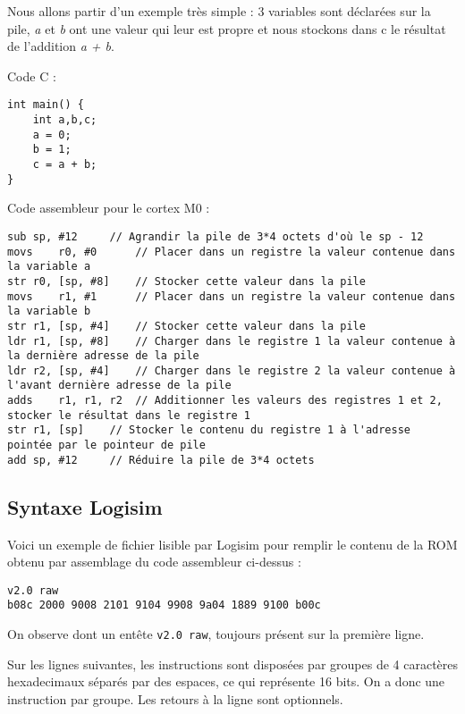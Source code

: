 Nous allons partir d'un exemple très simple : 3 variables sont déclarées sur la pile, \textit{a} et \textit{b} ont une valeur qui leur est propre et nous stockons dans c le résultat de l'addition \textit{a + b}.
\newline 
{}
\begin{minipage}{\linewidth}
Code C :
\begin{lstlisting}
int main() {
	int a,b,c;
	a = 0;
	b = 1;
	c = a + b;
}
\end{lstlisting}
\end{minipage}
\begin{center}
\begin{minipage}{\linewidth}
Code assembleur pour le cortex M0 :
\begin{lstlisting}
sub	sp, #12 	// Agrandir la pile de 3*4 octets d'où le sp - 12
movs	r0, #0 		// Placer dans un registre la valeur contenue dans la variable a 
str	r0, [sp, #8]	// Stocker cette valeur dans la pile
movs	r1, #1		// Placer dans un registre la valeur contenue dans la variable b 
str	r1, [sp, #4]	// Stocker cette valeur dans la pile
ldr	r1, [sp, #8]	// Charger dans le registre 1 la valeur contenue à la dernière adresse de la pile
ldr	r2, [sp, #4]	// Charger dans le registre 2 la valeur contenue à l'avant dernière adresse de la pile
adds	r1, r1, r2	// Additionner les valeurs des registres 1 et 2, stocker le résultat dans le registre 1
str	r1, [sp]	// Stocker le contenu du registre 1 à l'adresse pointée par le pointeur de pile
add	sp, #12		// Réduire la pile de 3*4 octets
\end{lstlisting}
\end{minipage}
\end{center}

\subsection{Syntaxe Logisim}

Voici un exemple de fichier lisible par Logisim pour remplir le contenu de la ROM obtenu par assemblage du code assembleur ci-dessus :
\begin{lstlisting}
v2.0 raw
b08c 2000 9008 2101 9104 9908 9a04 1889 9100 b00c 
\end{lstlisting}

On observe dont un entête \texttt{v2.0 raw}, toujours présent sur la première ligne.

Sur les lignes suivantes, les instructions sont disposées par groupes de 4 caractères hexadecimaux séparés par des espaces, ce qui représente 16 bits.
On a donc une instruction par groupe. Les retours à la ligne sont optionnels.
